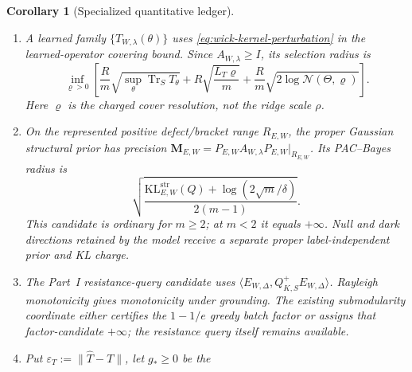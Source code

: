 \documentclass[11pt]{article}
\numberwithin{section}{part}
\theoremstyle{plain}
\newtheorem{corollary}[corollary]{Corollary}
\theoremstyle{definition}
\theoremstyle{remark}
\begin{document}
\begin{corollary}[Specialized quantitative ledger]
\begin{enumerate}[label=\textup{(\roman*)}]
feature-learning certificate
\begin{align}
 \label{eq:wick-feature-learning-bound}
 \operatorname{ExcessRisk}
 \le{}&C_{\rm var}\frac{\sigma^2
 N_W^{\widehat\theta}(\lambda,\rho)}m
 +C_{\rm bias}B_{\widehat\theta}(\rho;f_*)\notag\\
 &+r_{\rm sel}+L_{\rm sel}\varrho
 +\varepsilon_{\rm est}+\varepsilon_{\rm opt},
\end{align}
where, for an independent bounded-loss audit of size \(m_a\), one may take
\[
 r_{\rm sel}=L_{\rm loss}
 \sqrt{\frac{\log(2\mathcal N(\Theta,\varrho)/\delta)}{2m_a}}.
\]
The fixed-response/lazy regime is the specialization with no kernel movement;
a neural or nonlinear readout adds its own represented margin or covering
certificate and is combined only in common risk units.
\item A learned family \(\{T_{W,\lambda}(\theta)\}\) uses
\eqref{eq:wick-kernel-perturbation} in the learned-operator covering bound.
Since \(A_{W,\lambda}\ge I\), its selection radius is
\begin{equation}
 \label{eq:wick-learned-rademacher}
 \inf_{\varrho>0}\left[
 \frac Rm\sqrt{\sup_\theta\operatorname{Tr}_S T_\theta}
 +R\sqrt{\frac{L_T\varrho}{m}}
 +\frac Rm\sqrt{2\log\mathcal N(\Theta,\varrho)}
 \right].
\end{equation}
Here \(\varrho\) is the charged cover resolution, not the ridge scale
\(\rho\).
\item On the represented positive defect/bracket range \(R_{E,W}\), the
proper Gaussian structural prior has precision
\(\mathbf M_{E,W}=P_{E,W}A_{W,\lambda}P_{E,W}|_{R_{E,W}}\).  Its PAC--Bayes
radius is
\begin{equation}
 \label{eq:wick-pac-bayes}
 \sqrt{\frac{\mathrm{KL}_{E,W}^{\mathrm{str}}(Q)
 +\log(2\sqrt m/\delta)}{2(m-1)}}.
\end{equation}
This candidate is ordinary for \(m\ge2\); at \(m<2\) it equals
\(+\infty\).
Null and dark directions retained by the model receive a separate proper
label-independent prior and KL charge.
\item The Part~I resistance-query candidate uses
\(\langle E_{W,\Delta},Q_{K,S}^{+}E_{W,\Delta}\rangle\).  Rayleigh
monotonicity gives monotonicity under grounding.  The existing submodularity
coordinate either certifies the \(1-1/e\) greedy batch factor or assigns that
factor-candidate \(+\infty\); the resistance query itself remains available.
\item Put \(\varepsilon_T:=\|\widehat T-T\|\), let \(g_*\ge0\) be the

\end{enumerate}
\end{corollary}
\end{document}

